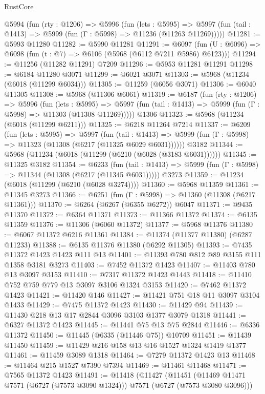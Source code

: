 \begin{lexlean}{RustCore}
\begin{coremodule}
  @5994
    (fun (rty : @1206) =>
    @5996
      (fun (lets : @5995) =>
      @5997 (fun (tail : @1413) => @5999 (fun (Γ : @5998) => @11236 (@11263 @11269)))))
@11281 := @5993 @11280
@11282 := @5990 @11281
@11291 := @6097 (fun (U : @6096) => @6098 (fun (t : @7) => @6106 (@5968 (@6112 @7211 @5986) @6123)))
@11294 := @11256 (@11282 @11291) @7209
@11296 := @5953 @11281 @11291
@11298 := @6184 @11280 @3071
@11299 := @6021 @3071
@11303 := @5968 (@11234 (@6018 (@11299 @6034)))
@11305 := @11259 (@6056 @3071)
@11306 := @6040 @11305
@11308 := @5968 (@11306 @6061)
@11319 := @6187
    (fun (rty : @1206) =>
    @5996
      (fun (lets : @5995) =>
      @5997 (fun (tail : @1413) => @5999 (fun (Γ : @5998) => @11303 (@11308 @11269)))))
    @1306
@11323 := @5968 (@11234 (@6018 (@11299 @6211)))
@11325 := @6218 @11264 @7214
@11337 := @6209
    (fun (lets : @5995) =>
    @5997
      (fun (tail : @1413) =>
      @5999 (fun (Γ : @5998) => @11323 (@11308 (@6217 (@11325 @6029 @6031))))))
    @3182
@11344 := @5968 (@11234 (@6018 (@11299 (@6210 (@6028 (@3183 @6031))))))
@11345 := @11325 @3182
@11354 := @6233
    (fun (tail : @1413) => @5999 (fun (Γ : @5998) => @11344 (@11308 (@6217 (@11345 @6031)))))
    @3273
@11359 := @11234 (@6018 (@11299 (@6210 (@6028 @3274))))
@11360 := @5968 @11359
@11361 := @11345 @3273
@11366 := @6251 (fun (Γ : @5998) => @11360 (@11308 (@6217 @11361)))
@11370 := @6264 (@6267 (@6355 @6272)) @6047
@11371 := @9435 @11370
@11372 := @6364 @11371
@11373 := @11366 @11372
@11374 := @6135 @11359
@11376 := @11306 (@6060 @11372)
@11377 := @5968 @11376
@11380 := @6067 @11372 @6216 @11361
@11384 := @11374 (@11377 @11380) (@6287 @11233)
@11388 := @6135 @11376 @11380 (@6292 @11305)
@11393 := @7435 @11372 @1423 @1423 @111 @13
@11401 := @11393 @780 @812 @89 @3155 @111 @1358 @3181 @3273
@11403 := @7452 @11372 @1423
@11407 := @11403 @780 @13 @3097 @3153
@11410 := @7317 @11372 @1423 @1443
@11418 := @11410 @752 @759 @779 @13 @3097 @3106 @1324 @3153
@11420 := @7462 @11372 @1423
@11421 := @11420 @146
@11427 := @11421 @751 @18 @11 @3097 @3104 @1433
@11429 := @7475 @11372 @1423
@11430 := @11429 @94
@11439 := @11430 @218 @13 @17 @2844 @3096 @3103 @1377 @3079 @1318
@11441 := @6327 @11372 @1423
@11445 := @11441 @75 @13 @75 @2844
@11446 := @6336 @11372
@11450 := @11445 (@6335 (@11446 @75)) @10709
@11451 := @11439 @11450
@11459 := @11429 @216 @158 @13 @16 @1527 @1324 @1419 @1377
@11461 := @11459 @3089 @1318
@11464 := @7279 @11372 @1423 @13
@11468 := @11464 @215 @1527 @7390 @7394
@11469 := @11461 @11468
@11471 := @7565 @11372 @1423
@11491 := @11418
    (@11427
      (@11451 (@11469 @11471 @7571 (@6727 (@7573 @3090 @1324))) @7571 (@6727 (@7573 @3080 @3096)))

\end{coremodule}
\end{lexlean}
